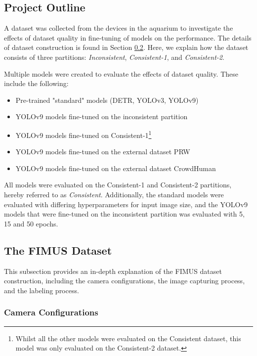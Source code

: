 \subsection{Project Outline}
\label{sec:project}
A dataset was collected from the devices in the aquarium to investigate the effects of dataset quality in fine-tuning of models on the performance. The details of dataset construction is found in Section \ref{sec:dataset_construction}. Here, we explain how the dataset consists of three partitions: \textit{Inconsistent}, \textit{Consistent-1}, and \textit{Consistent-2}. 

Multiple models were created to evaluate the effects of dataset quality. These include the following:
\begin{itemize}
    \item Pre-trained "standard" models (DETR, YOLOv3, YOLOv9)
    \item YOLOv9 models fine-tuned on the inconsistent partition
    \item YOLOv9 models fine-tuned on Consistent-1\footnote{Whilst all the other models were evaluated on the Consistent dataset, this model was only evaluated on the Consistent-2 dataset.}
    \item YOLOv9 models fine-tuned on the external dataset PRW
    \item YOLOv9 models fine-tuned on the external dataset CrowdHuman
\end{itemize}

All models were evaluated on the Consistent-1 and Consistent-2 partitions, hereby referred to as \textit{Consistent}. Additionally, the standard models were evaluated with differing hyperparameters for input image size, and the YOLOv9 models that were fine-tuned on the inconsistent partition was evaluated with 5, 15 and 50 epochs.

\subsection{The FIMUS Dataset}
\label{sec:dataset_construction}
This subsection provides an in-depth explanation of the FIMUS dataset construction, including the camera configurations, the image capturing process, and the labeling process.

\subsubsection{Camera Configurations}
